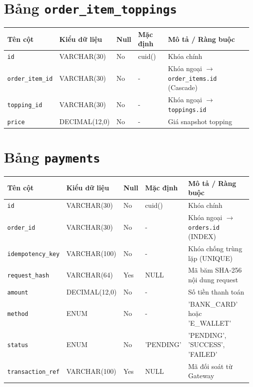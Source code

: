 \section{Bảng \texttt{order\_item\_toppings}}
\begin{table}[htbp]
\centering
\small
\begin{tabularx}{\textwidth}{llllX}
\toprule
\textbf{Tên cột} & \textbf{Kiểu dữ liệu} & \textbf{Null} & \textbf{Mặc định} & \textbf{Mô tả / Ràng buộc} \\
\midrule
\texttt{id} & VARCHAR(30) & No & cuid() & Khóa chính \\
\texttt{order\_item\_id} & VARCHAR(30) & No & - & Khóa ngoại \(\to\) \texttt{order\_items.id} (Cascade) \\
\texttt{topping\_id} & VARCHAR(30) & No & - & Khóa ngoại \(\to\) \texttt{toppings.id} \\
\texttt{price} & DECIMAL(12,0) & No & - & Giá snapshot topping \\
\bottomrule
\end{tabularx}
\end{table}

\section{Bảng \texttt{payments}}
\begin{table}[htbp]
\centering
\small
\begin{tabularx}{\textwidth}{llllX}
\toprule
\textbf{Tên cột} & \textbf{Kiểu dữ liệu} & \textbf{Null} & \textbf{Mặc định} & \textbf{Mô tả / Ràng buộc} \\
\midrule
\texttt{id} & VARCHAR(30) & No & cuid() & Khóa chính \\
\texttt{order\_id} & VARCHAR(30) & No & - & Khóa ngoại \(\to\) \texttt{orders.id} (INDEX) \\
\texttt{idempotency\_key} & VARCHAR(100) & No & - & Khóa chống trùng lặp (UNIQUE) \\
\texttt{request\_hash} & VARCHAR(64) & Yes & NULL & Mã băm SHA-256 nội dung request \\
\texttt{amount} & DECIMAL(12,0) & No & - & Số tiền thanh toán \\
\texttt{method} & ENUM & No & - & 'BANK\_CARD' hoặc 'E\_WALLET' \\
\texttt{status} & ENUM & No & 'PENDING' & 'PENDING', 'SUCCESS', 'FAILED' \\
\texttt{transaction\_ref} & VARCHAR(100) & Yes & NULL & Mã đối soát từ Gateway \\
\bottomrule
\end{tabularx}
\end{table}

